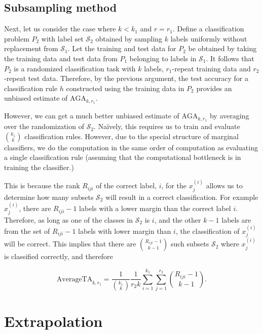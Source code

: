 \documentclass[12pt]{article}
\begin{document}
\subsection{Subsampling method}

Next, let us consider the case where $k < k_1$ and $r=r_1$.  Define a
classification problem $P_2$ with label set $\mathcal{S}_2$ obtained
by sampling $k$ labels uniformly without replacement from
$\mathcal{S}_1$.  Let the training and test data for $P_2$ be obtained
by taking the training data and test data from $P_1$ belonging to
labels in $\mathcal{S}_1$.  It follows that $P_2$ is a randomized
classification task with $k$ labels, $r_1$-repeat training data and
$r_2$-repeat test data.  Therefore, by the previous argument, the test
accuracy for a classification rule $h$ constructed using the training data
in $P_2$ provides an unbiased estimate of $\text{AGA}_{k, r_1}$.

However, we can get a much better unbiased estimate of
$\text{AGA}_{k, r_1}$ by averaging over the randomization of
$\mathcal{S}_2$.  Na\"{i}vely, this requires us to train and evaluate
${k_1}\choose{k}$ classification rules.  However, due to the special
structure of marginal classifiers, we do the computation in the same
order of computation as evaluating a single classification rule
(assuming that the computational bottleneck is in training the
classifier.)

This is because the rank $R_{iji}$ of the correct label, $i$, for the
$x_j^{(i)}$ allows us to determine how many subsets $\mathcal{S}_2$
will result in a correct classification.  For example $x_j^{(i)}$,
there are $R_{iji} - 1$ labels with a lower margin than the correct
label $i$.  Therefore, as long as one of the classes in
$\mathcal{S}_2$ is $i$, and the other $k-1$ labels are from the set of
$R_{iji}-1$ labels with lower margin than $i$, the classification of
$x_j^{(i)}$ will be correct.  This implies that there are
${R_{iji}-1}\choose{k-1}$ such subsets $\mathcal{S}_2$ where
$x_j^{(i)}$ is classified correctly, and therefore

\begin{equation}\label{eq:avtestrisk}
\text{AverageTA}_{k, r_1} = \frac{1}{{{k_1}\choose{k}}}\frac{1}{r_2 k} \sum_{i=1}^{k_1} \sum_{j=1}^{r_2} {{R_{iji}-1}\choose{k-1}}.
\end{equation}

\section{Extrapolation}
\end{document}
